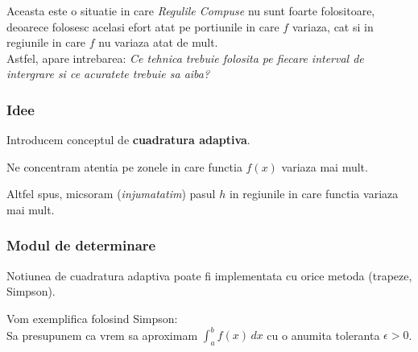 \documentclass{article}
\begin{document}
Aceasta este o situatie in care \textit{Regulile Compuse} nu sunt foarte folositoare, deoarece folosesc acelasi efort atat pe portiunile in care $f$ variaza, cat si in regiunile in care $f$ nu variaza atat de mult. \\

Astfel, apare intrebarea: \textit{Ce tehnica trebuie folosita pe fiecare interval de intergrare si ce acuratete trebuie sa aiba?}


\subsubsection{Idee}

\tab Introducem conceptul de \textbf{cuadratura adaptiva}.\framebox[0.4cm][r]{\footnotemark}

Ne concentram atentia pe zonele in care functia $f(x)$ variaza mai
mult.

Altfel spus, micsoram (\textit{injumatatim}) pasul $h$ in regiunile in care functia variaza mai mult.


\subsubsection{Modul de determinare}
\tab Notiunea de cuadratura adaptiva poate fi implementata cu orice metoda (trapeze, Simpson).

Vom exemplifica folosind Simpson: \\


Sa presupunem ca vrem sa aproximam $\int_a^b f(x)\, dx$ cu o anumita toleranta $\epsilon > 0$. 
\end{document}
